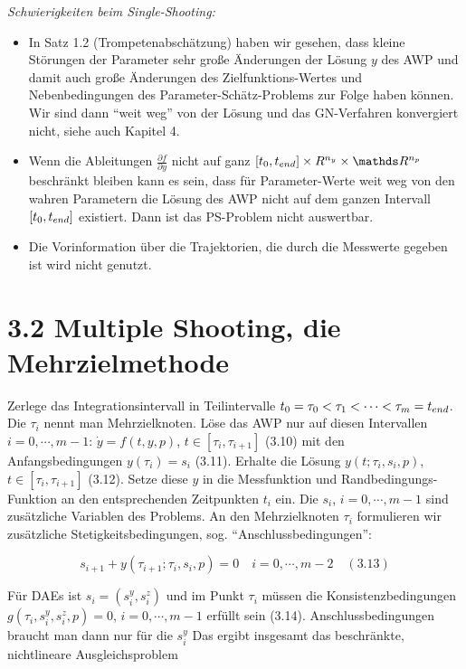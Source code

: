 \emph{Schwierigkeiten beim Single-Shooting:}

\begin{itemize}
\item In Satz 1.2 (Trompetenabschätzung) haben wir gesehen, dass kleine Störungen der Parameter sehr große Änderungen der Lösung $y$ des AWP und damit auch große Änderungen des Zielfunktions-Wertes und Nebenbedingungen des Parameter-Schätz-Problems zur Folge haben können. Wir sind dann "`weit weg"' von der Lösung und das GN-Verfahren konvergiert nicht, siehe auch Kapitel 4.
\item Wenn die Ableitungen $\tfrac{\partial f}{\partial y}$ nicht auf ganz $[t_0,\tend]\times R^{n_y} \times \R^{n_p}$  beschränkt bleiben kann es sein, dass für Parameter-Werte weit weg von den wahren Parametern die Lösung des AWP nicht auf dem ganzen Intervall $[t_0,t_{end}]$ existiert. Dann  ist das PS-Problem nicht auswertbar.
\item Die Vorinformation über die Trajektorien, die durch die Messwerte gegeben ist wird nicht genutzt.
\end{itemize}

\section*{3.2 Multiple Shooting, die Mehrzielmethode}

Zerlege das Integrationsintervall in Teilintervalle $t_0 = \tau_0 < \tau_1 < \cdots < \tau_m = t_{end}$. Die $\tau_i$ nennt man Mehrzielknoten. Löse das AWP nur auf diesen Intervallen $i=0,\cdots,m-1$: $\dot y = f(t,y,p)$, $t \in [\tau_i, \tau_{i+1} ]$ (3.10) mit den Anfangsbedingungen $y(\tau_i) = s_i$ (3.11). Erhalte die Lösung $y(t; \tau_i, s_i,p)$, $t\in[\tau_i, \tau_{i+1}]$ (3.12). Setze diese $y$ in die Messfunktion und Randbedingungs-Funktion an den entsprechenden Zeitpunkten $t_i$ ein. Die $s_i$, $i=0,\cdots,m-1$ sind zusätzliche Variablen des Problems. An den Mehrzielknoten $\tau_i$ formulieren wir zusätzliche  Stetigkeitsbedingungen, sog. "`Anschlussbedingungen"':

\[ s_{i+1} + y(\tau_{i+1}; \tau_i, s_i, p) = 0 \quad i=0,\cdots,m-2 \quad (3.13)\]

Für DAEs ist $s_i = (s_i^y, s_i^z)$ und im Punkt $\tau_i$ müssen die Konsistenzbedingungen $g(\tau_i, s_i^y, s_i^z, p) = 0$, $i=0,\cdots,m-1$ erfüllt sein (3.14). Anschlussbedingungen braucht man dann nur für die $s_i^y$ Das ergibt insgesamt das beschränkte, nichtlineare Ausgleichsproblem

